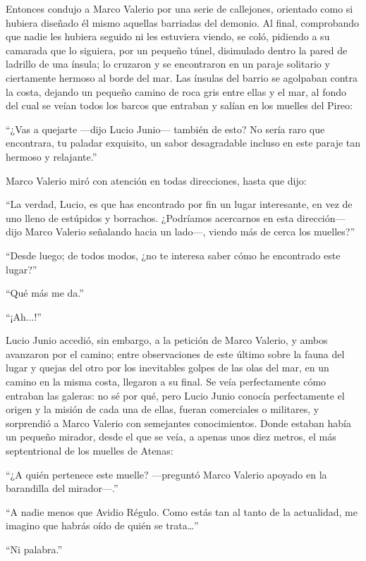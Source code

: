\documentclass[11pt,openany]{book}
\begin{document}
Entonces condujo a Marco Valerio por una serie de callejones, orientado como si hubiera diseñado él mismo aquellas barriadas del demonio. Al final, comprobando que nadie les hubiera seguido ni les estuviera viendo, se coló, pidiendo a su camarada que lo siguiera, por un pequeño túnel, disimulado dentro la pared de ladrillo de una ínsula; lo cruzaron y se encontraron en un paraje solitario y ciertamente hermoso al borde del mar. Las ínsulas del barrio se agolpaban contra la costa, dejando un pequeño camino de roca gris entre ellas y el mar, al fondo del cual se veían todos los barcos que entraban y salían en los muelles del Pireo: 

“¿Vas a quejarte —dijo Lucio Junio— también de esto? No sería raro que encontrara, tu paladar exquisito, un sabor desagradable incluso en este paraje tan hermoso y relajante.” 

Marco Valerio miró con atención en todas direcciones, hasta que dijo: 

“La verdad, Lucio, es que has encontrado por fin un lugar interesante, en vez de uno lleno de estúpidos y borrachos. ¿Podríamos acercarnos en esta dirección—dijo Marco Valerio señalando hacia un lado—, viendo más de cerca los muelles?” 

“Desde luego; de todos modos, ¿no te interesa saber cómo he encontrado este lugar?” 

“Qué más me da.”

“¡Ah...!” 

Lucio Junio accedió, sin embargo, a la petición de Marco Valerio, y ambos avanzaron por el camino; entre observaciones de este último sobre la fauna del lugar y quejas del otro por los inevitables golpes de las olas del mar, en un camino en la misma costa, llegaron a su final. Se veía perfectamente cómo entraban las galeras: no sé por qué, pero Lucio Junio conocía perfectamente el origen y la misión de cada una de ellas, fueran comerciales o militares, y sorprendió a Marco Valerio con semejantes conocimientos. Donde estaban había un pequeño mirador, desde el que se veía, a apenas unos diez metros, el más septentrional de los muelles de Atenas: 

“¿A quién pertenece este muelle? —preguntó Marco Valerio apoyado en la barandilla del mirador—.” 

“A nadie menos que Avidio Régulo. Como estás tan al tanto de la actualidad, me imagino que habrás oído de quién se trata\dots” 

“Ni palabra.” 
\end{document}
